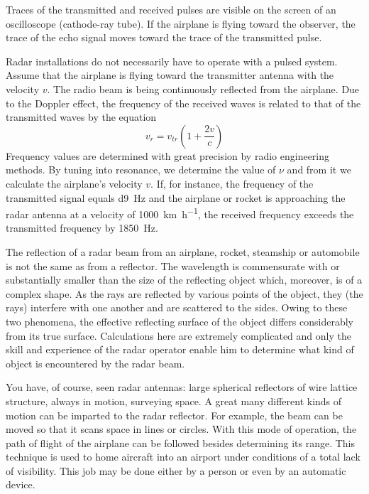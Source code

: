 Traces of the transmitted and received pulses are visible on the screen of an oscilloscope (cathode-ray tube). If the airplane is flying toward the observer, the trace of the echo signal moves toward the trace of the transmitted pulse.

Radar installations do not necessarily have to operate with a pulsed system. Assume that the airplane is flying toward the transmitter antenna with the velocity $v$. The radio beam is being continuously reflected from the airplane. Due to the Doppler effect, the frequency of the received waves is related to that of the transmitted waves by the equation
\begin{equation*}%
v_{r} = v_{tr} \left( 1 + \frac{2v}{c} \right)
\end{equation*}
Frequency values are determined with great precision by radio engineering methods. By tuning into resonance, we determine the value of $\nu$ and from it we calculate the airplane's velocity $v$. If, for instance, the frequency of the transmitted signal equals \SI{d9}{\hertz} and the airplane or rocket is approaching the radar antenna at a velocity of \SI{1000}{\kilo\meter\per\hour}, the received frequency exceeds the transmitted frequency by \SI{1850}{\hertz}.

The reflection of a radar beam from an airplane, rocket, steamship or automobile is not the same as from a reflector. The wavelength is commensurate with or substantially smaller than the size of the reflecting object which, moreover, is of a complex shape. As the rays are reflected by various points of the object, they (the rays) interfere with one another and are scattered to the sides. Owing to these two phenomena, the effective reflecting surface of the object differs considerably from its true surface. Calculations here are extremely complicated and only the skill and experience of the radar operator enable him to determine what kind of object is encountered by the radar beam.

You have, of course, seen radar antennas: large spherical reflectors of wire lattice structure, always in motion, surveying space. A great many different kinds of motion can be imparted to the radar reflector. For example, the beam can be moved so that it scans space in lines or circles. With this mode of operation, the path of flight of the airplane can be followed besides determining its range.
This technique is used to home aircraft into an airport under conditions of a total lack of visibility. This job may be done either by a person or even by an automatic device.

